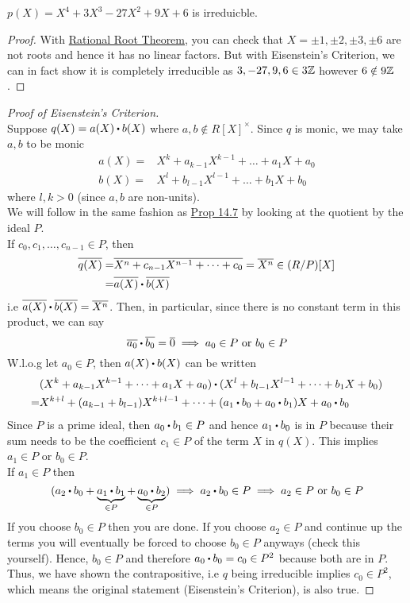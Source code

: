 \documentclass[../Main.tex]{subfiles}
\begin{document}
\begin{claim}
	$p(X) =X^4+3X^3-27X^2+9X+6$ is irreduicble. 
\end{claim}
\begin{proof}
	With \hyperref[prop:rational]{Rational Root Theorem}, you can check that $X=\pm1, \pm 2,\pm 3, \pm 6$ are not roots and hence it has no linear factors. But with Eisenstein's Criterion, we can in fact show it is completely irreducible as
	$3,-27,9,6\in 3\mathbb{Z}$ however $6\notin 9\mathbb{Z}$.
\end{proof}
\begin{proof}[Proof of Eisenstein's Criterion]~\\
	Suppose $q(X)=a(X)\rdot b(X)$ where $a,b\notin R[X]^\times$. Since $q$ is monic, we may take $a,b$ to be monic
	\begin{align*}
	a(X)=&X^k+a_{k-1}X^{k-1}+\dots+a_1X+a_0\\
	b(X)=&X^l+b_{l-1}X^{l-1}+\dots+b_1X+b_0
	\end{align*}
	where $l,k>0$ (since $a,b$ are non-units).\\
	We will follow in the same fashion as \hyperref[prop:14.7]{Prop 14.7} by looking at the quotient by the ideal $P$.\\
	If $c_0,c_1,\dots,c_{n-1}\in P$, then
	\begin{align*}
	\obar{q(X)}=&\obar{X^n+c_{n-1}X^{n-1}+\dots+c_0}=\obar{X^n} \in (R/P)[X] \\
	 =&\obar{a(X)}\rdot \obar{b(X)}
	\end{align*}
	i.e $\obar{a(X)}\rdot \obar{b(X)} = \obar{X^n}$. Then, in particular, since there is no constant term in this product, we can say
	\[\obar{a_0}\rdot \obar{b_0}=\obar{0} \implies a_0 \in P \text{ or } b_0\in P\]
	W.l.o.g let $a_0\in P$, then $a(X)\rdot b(X)$ can be written
	\begin{align*}
	&(X^k+a_{k-1}X^{k-1}+\dots+a_1X+a_0)\rdot (X^l+b_{l-1}X^{l-1}+\dots+b_1X+b_0) \\
	=&X^{k+l}+(a_{k-1}+b_{l-1})X^{k+l-1}+\dots+(a_1\rdot b_0+a_0\rdot b_1)X+a_0\rdot b_0
	\end{align*}
	Since $P$ is a prime ideal, then $a_0\rdot b_1\in P$ and hence $a_1\rdot b_0$ is in $P$ because their sum needs to be the coefficient $c_1 \in P$ of the term $X$ in $q(X)$. This implies $a_1\in P$ or $b_0\in P$.\\
	If $a_1\in P$ then
	\[(a_2\rdot b_0+\underbrace{a_1\rdot b_1}_{\in P} + \underbrace{a_0\rdot b_2}_{\in P}) \implies a_2\rdot b_0\in P \implies a_2\in P \text{ or } b_0\in P \]
	If you choose $b_0 \in P$ then you are done. If you choose $a_2 \in P$ and continue up the terms you will eventually be forced to choose $b_0\in P$ anyways (check this yourself). Hence, $b_0 \in P$ and therefore $a_0\rdot b_0 =c_0 \in P^2$ because both are in $P$.\\
	Thus, we have shown the contrapositive, i.e $q$ being irreducible implies $c_0\in P^2$, which means the original statement (Eisenstein's Criterion), is also true.
\end{proof}
\end{document}
